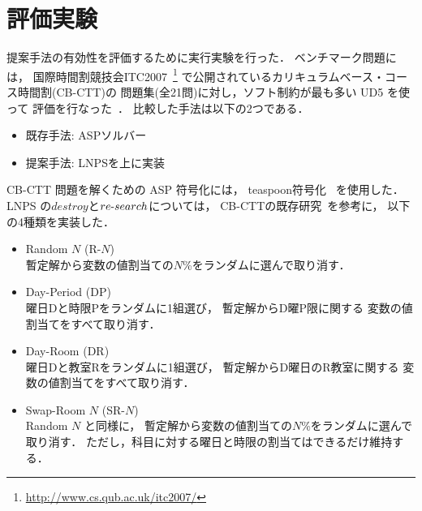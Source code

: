 \section{評価実験}


提案手法の有効性を評価するために実行実験を行った．
ベンチマーク問題には，
国際時間割競技会ITC2007~\footnote{%
  \url{http://www.cs.qub.ac.uk/itc2007/}}
で公開されているカリキュラムベース・コース時間割(CB-CTT)の
問題集(全21問)に対し，ソフト制約が最も多い UD5 を使って
評価を行なった~\cite{GasperoMS/ITC2007,DBLP:journals/anor/BonuttiCGS12}．
%
比較した手法は以下の2つである．
\begin{itemize}\compress
\item 既存手法: ASPソルバー{\clingo}
\item 提案手法: LNPSを{\clingo}上に実装
\end{itemize}

CB-CTT 問題を解くための ASP 符号化には，
\textsf{teaspoon}符号化~\cite{anor/Banbara2019}
を使用した．
LNPS の$destroy$と$re\mathchar`-search$については，
CB-CTTの既存研究~\cite{anor/Kiefer2017}を参考に，
以下の4種類を実装した．
\begin{itemize}\compress
\item \textsf{Random} $N$ (\textsf{R-$N$})\\
  暫定解から変数の値割当ての$N$\%をランダムに選んで取り消す．
\item \textsf{Day-Period} (\textsf{DP})\\
  曜日\textsf{D}と時限\textsf{P}をランダムに1組選び，
  暫定解から\textsf{D}曜\textsf{P}限に関する
  変数の値割当てをすべて取り消す．
\item \textsf{Day-Room} (\textsf{DR})\\
  曜日\textsf{D}と教室\textsf{R}をランダムに1組選び，
  暫定解から\textsf{D}曜日の\textsf{R}教室に関する
  変数の値割当てをすべて取り消す．
\item \textsf{Swap-Room} $N$ (\textsf{SR-$N$})\\
  \textsf{Random} $N$ と同様に，
  暫定解から変数の値割当ての$N$\%をランダムに選んで取り消す．
  ただし，科目に対する曜日と時限の割当てはできるだけ維持する．
\end{itemize}

